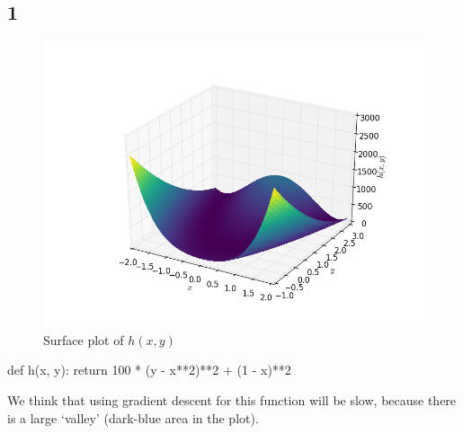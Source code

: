 \documentclass{article}
\begin{document}
\subsection*{1}
\begin{figure}[H]
\centering
\includegraphics[width=.6\textwidth]{images/h.png}
\caption{Surface plot of $h(x, y)$}
\end{figure}
\begin{python}
def h(x, y):
    return 100 * (y - x**2)**2 + (1 - x)**2
\end{python}
We think that using gradient descent for this function will be slow, because there is a large `valley' (dark-blue area in the plot).
\end{document}
